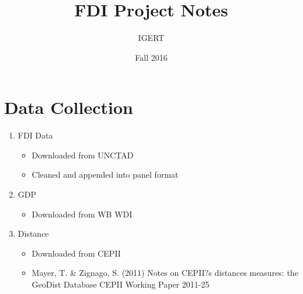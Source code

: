 \documentclass{article}
\begin{document}
\title{FDI Project Notes}
\author{IGERT}
\date{Fall 2016}
\maketitle

\section{Data Collection}



\begin{enumerate}
	\item {FDI Data}
		\begin{itemize}
			\item{Downloaded from UNCTAD}
			\item{Cleaned and appended into panel format}
		\end{itemize}
	\item {GDP}
		\begin{itemize}
			\item{Downloaded from WB WDI}
		\end{itemize}
	\item {Distance}
		\begin{itemize}
			\item{Downloaded from CEPII}
			\item{Mayer, T. \& Zignago, S. (2011) Notes on CEPII?s distances measures: the GeoDist Database
					CEPII Working Paper 2011-25}
		\end{itemize}
		
\end{enumerate}
\end{document}
